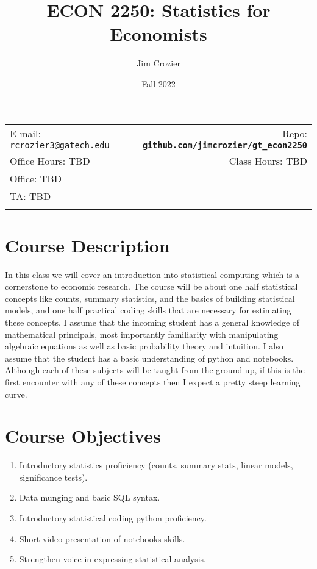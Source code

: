 \documentclass[11pt]{article}
\title{ECON 2250: Statistics for Economists}
\author{Jim Crozier}
\date{Fall 2022}
\newcommand{\blankline}{\quad\pagebreak[2]}
\begin{document}
\maketitle

\blankline

\begin{tabular*}{.93\textwidth}{@{\extracolsep{\fill}}lr}


  E-mail: \texttt{rcrozier3@gatech.edu} & Repo: \href{http://github.com/jimcrozier/gt\_econ2250}{\tt\bf github.com/jimcrozier/gt\_econ2250}  \\

Office Hours: TBD  &  Class Hours: TBD \\


Office: TBD \\
TA: TBD \\
&  \\
\hline
\end{tabular*}

\vspace{10 mm}

\section*{Course Description}

In this class we will cover an introduction into statistical computing which is a cornerstone to economic research. The course will be about one half statistical concepts like counts, summary statistics, and the basics of building statistical models, and one half practical coding skills that are necessary for estimating these concepts. I assume that the incoming student has a general knowledge of mathematical principals, most importantly familiarity with manipulating algebraic equations as well as basic probability theory and intuition. I also assume that the student has a basic understanding of python and notebooks. Although each of these subjects will be taught from the ground up, if this is the first encounter with any of these concepts then I expect a pretty steep learning curve. 


\section*{Course Objectives}
\begin{enumerate}
\item Introductory statistics proficiency (counts, summary stats, linear models, significance tests).
\item Data munging and basic SQL syntax. 
\item Introductory statistical coding python proficiency.
\item Short video presentation of notebooks skills.
\item Strengthen voice in expressing statistical analysis. 
\end{enumerate}
\end{document}

